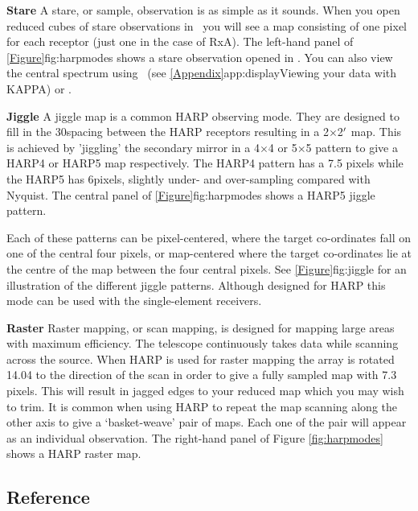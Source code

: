\documentclass[11pt,oneside,chapters]{starlink}
\newcommand{\udeg}{\hspace{-0.3em}\dgs\hspace{-0.08em}}
\newcommand{\uarcs}{\hspace{-0.27em}\arcsec\hspace{-0.07em}}
\newcommand{\udeg}{\HCode{&deg}}
\newcommand{\uarcs}{$''$}
\begin{document}
\begin{aligndesc}
\item[\textbf{Stare}]
A stare, or sample, observation is as simple as it sounds. When you
open reduced cubes of stare observations in \gaia\ you will see a map
consisting of one pixel for each receptor (just one in the case of
RxA). The left-hand panel of \cref{Figure}{fig:harpmodes}{} shows a stare
observation opened in \gaia. You can also view the central spectrum
using \linplot\ (see \cref{Appendix}{app:display}{Viewing your data
with KAPPA}) or \splat.

\item[\textbf{Jiggle}]
A jiggle map is a common HARP observing mode. They are designed to
fill in the 30\arcsec spacing between the HARP receptors resulting in a
2\arcm$\times$2$\arcm$ map. This is achieved by 'jiggling' the secondary
mirror in a 4$\times$4 or 5$\times$5 pattern to give a HARP4 or HARP5
map respectively.  The HARP4 pattern has a 7.\uarcs5 pixels while the
HARP5 has 6\arcsec pixels, slightly under- and over-sampling compared
with Nyquist. The central panel of \cref{Figure}{fig:harpmodes}{} shows a
HARP5 jiggle pattern.

Each of these patterns can be pixel-centered, where the target
co-ordinates fall on one of the central four pixels, or map-centered where
the target co-ordinates lie at the centre of the map between the four
central pixels. See \cref{Figure}{fig:jiggle}{} for an illustration of the
different jiggle patterns. Although designed for HARP this mode can be
used with the single-element receivers.

\item[\textbf{Raster}]
Raster mapping, or scan mapping, is designed for mapping large areas
with maximum efficiency. The telescope continuously takes data while
scanning across the source. When HARP is used for raster mapping the
array is rotated 14.\udeg04 to the direction of the scan in order
to give a fully sampled map with 7.\uarcs3 pixels. This will result in
jagged edges to your reduced map which you may wish to trim. It is
common when using HARP to repeat the map scanning along the other axis
to give a `basket-weave' pair of maps. Each one of the pair will
appear as an individual observation.  The right-hand panel of Figure
\ref{fig:harpmodes} shows a HARP raster map.
\end{aligndesc}

\subsection{Reference}
\end{document}
